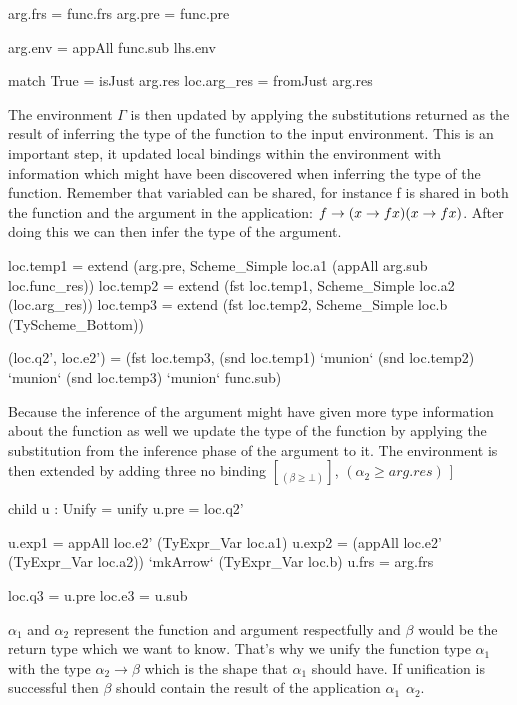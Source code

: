 \begin{code}       
       arg.frs = func.frs
       arg.pre = func.pre
       
       arg.env = appAll func.sub lhs.env
    
       match True = isJust arg.res   
       loc.arg_res = fromJust arg.res
\end{code}
The environment $\Gamma$ is then updated by applying the substitutions returned as the result of inferring the type of the function to the input environment. This is an important step, it updated local bindings within the environment with information which might have been discovered when inferring the type of the function. Remember that variabled can be shared, for instance f is shared in both the function and the argument in the application: $\\f \rightarrow (\\x \rightarrow f x) (\\x \rightarrow f x)$. After doing this we can then infer the type of the argument.
       
\begin{code}
       loc.temp1 = extend (arg.pre, Scheme_Simple loc.a1 (appAll arg.sub loc.func_res))
       loc.temp2 = extend (fst loc.temp1, Scheme_Simple loc.a2 (loc.arg_res))
       loc.temp3 = extend (fst loc.temp2, Scheme_Simple loc.b  (TyScheme_Bottom))
       
       (loc.q2', loc.e2') = (fst loc.temp3, (snd loc.temp1) `munion` (snd loc.temp2) `munion` (snd loc.temp3) `munion` func.sub)
\end{code}
Because the inference of the argument might have given more type information about the function as well we update the type of the function by applying the substitution from the inference phase of the argument to it. The environment is then extended by adding three no binding $\brack (\beta \geq \bot)$, $(\alpha_2 \geq arg.res)$ $\rbrack$

\begin{code}
       child u : Unify = unify
       u.pre  = loc.q2'
       
       u.exp1 = appAll loc.e2' (TyExpr_Var loc.a1)
       u.exp2 = (appAll loc.e2' (TyExpr_Var loc.a2)) `mkArrow` (TyExpr_Var loc.b)
       u.frs  = arg.frs
       
       loc.q3 = u.pre
       loc.e3 = u.sub
\end{code}
$\alpha_1$ and $\alpha_2$ represent the function and argument respectfully and $\beta$ would be the return type which we want to know. That's why we unify the function type $\alpha_1$ with the type $\alpha_2 \rightarrow \beta$ which is the shape that $\alpha_1$ should have. If unification is successful then $\beta$ should contain the result of the application $\alpha_1 \hspace{5pt} \alpha_2$.



